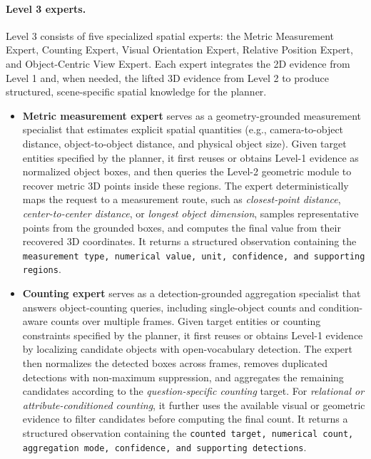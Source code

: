 \documentclass{llmxive}
\begin{document}
\paragraph{Level 3 experts.}
Level 3 consists of five specialized spatial experts: the Metric Measurement Expert, Counting Expert, Visual Orientation Expert, Relative Position Expert, and Object-Centric View Expert. 
Each expert integrates the 2D evidence from Level 1 and, when needed, the lifted 3D evidence from Level 2 to produce structured, scene-specific spatial knowledge for the planner.

\begin{itemize}
\item  \textbf{Metric measurement expert} serves as a geometry-grounded measurement specialist that estimates explicit spatial quantities (e.g., camera-to-object distance, object-to-object distance, and physical object size). 
% 
Given target entities specified by the planner, it first reuses or obtains Level-1 evidence as normalized object boxes, and then queries the Level-2 geometric module to recover metric 3D points inside these regions.
The expert deterministically maps the request to a measurement route, such as \textit{closest-point distance}, \textit{center-to-center distance}, or \textit{longest object dimension}, samples representative points from the grounded boxes, and computes the final value from their recovered 3D coordinates.
It returns a structured observation containing the \texttt{measurement type, numerical value, unit, confidence, and supporting regions}.

\item \textbf{Counting expert} serves as a detection-grounded aggregation specialist that answers object-counting queries, including single-object counts and condition-aware counts over multiple frames.
%
Given target entities or counting constraints specified by the planner, it first reuses or obtains Level-1 evidence by localizing candidate objects with open-vocabulary detection.
The expert then normalizes the detected boxes across frames, removes duplicated detections with non-maximum suppression, and aggregates the remaining candidates according to the \textit{question-specific counting} target.
% 
For \textit{relational or attribute-conditioned counting}, it further uses the available visual or geometric evidence to filter candidates before computing the final count.
It returns a structured observation containing the \texttt{counted target, numerical count, aggregation mode, confidence, and supporting detections}.


\end{itemize}
\end{document}
